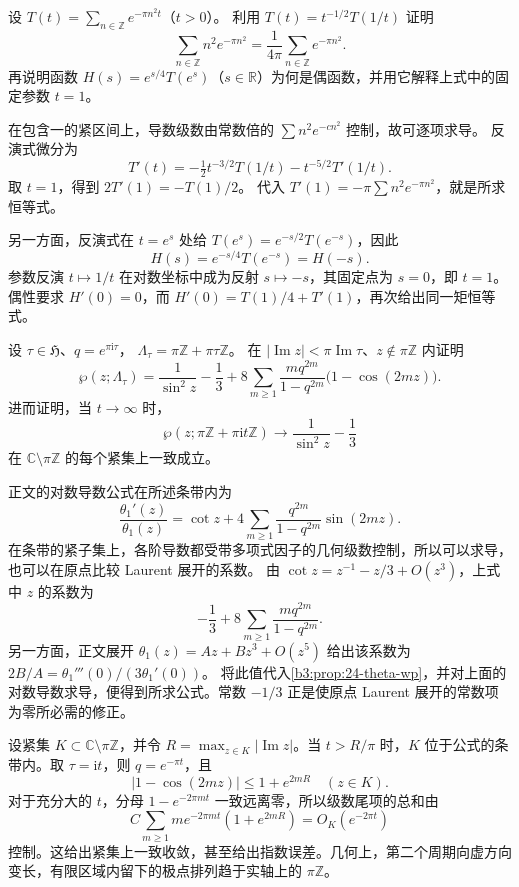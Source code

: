 \begin{exercise}\label{b3:ex:24-4}
设 \(T(t)=\sum_{n\in\mathbb Z}e^{-\pi n^2t}\)（\(t>0\)）。
利用 \(T(t)=t^{-1/2}T(1/t)\) 证明
\[
\sum_{n\in\mathbb Z}n^2e^{-\pi n^2}
=\frac1{4\pi}\sum_{n\in\mathbb Z}e^{-\pi n^2}.
\]
再说明函数 \(H(s)=e^{s/4}T(e^s)\)（\(s\in\mathbb R\)）为何是偶函数，并用它解释上式中的固定参数 \(t=1\)。
\end{exercise}
\begin{solution}
在包含一的紧区间上，导数级数由常数倍的
\(\sum n^2e^{-c n^2}\) 控制，故可逐项求导。
反演式微分为
\[
T'(t)=-\tfrac12t^{-3/2}T(1/t)-t^{-5/2}T'(1/t).
\]
取 \(t=1\)，得到 \(2T'(1)=-T(1)/2\)。
代入 \(T'(1)=-\pi\sum n^2e^{-\pi n^2}\)，就是所求恒等式。

另一方面，反演式在 \(t=e^s\) 处给
\(T(e^s)=e^{-s/2}T(e^{-s})\)，因此
\[
H(s)=e^{-s/4}T(e^{-s})=H(-s).
\]
参数反演 \(t\mapsto1/t\) 在对数坐标中成为反射
\(s\mapsto-s\)，其固定点为 \(s=0\)，即 \(t=1\)。
偶性要求 \(H'(0)=0\)，而
\(H'(0)=T(1)/4+T'(1)\)，再次给出同一矩恒等式。
\end{solution}

\begin{exercise}\label{b3:ex:24-5}
设 \(\tau\in\mathfrak H\)、\(q=e^{\pi\mathrm{i}\tau}\)，
\(\Lambda_\tau=\pi\mathbb Z+\pi\tau\mathbb Z\)。
在 \(|\operatorname{Im}z|<\pi\operatorname{Im}\tau\)、\(z\notin\pi\mathbb Z\) 内证明
\[
\wp(z;\Lambda_\tau)=\frac1{\sin^2z}-\frac13
 +8\sum_{m\ge1}\frac{m q^{2m}}{1-q^{2m}}
                         \bigl(1-\cos(2mz)\bigr).
\]
进而证明，当 \(t\to\infty\) 时，
\[
\wp(z;\pi\mathbb Z+\pi\mathrm{i}t\mathbb Z)
\longrightarrow\frac1{\sin^2z}-\frac13
\]
在 \(\mathbb C\setminus\pi\mathbb Z\) 的每个紧集上一致成立。
\end{exercise}
\begin{solution}
正文的对数导数公式在所述条带内为
\[
\frac{\theta_1'(z)}{\theta_1(z)}
=\cot z+4\sum_{m\ge1}
              \frac{q^{2m}}{1-q^{2m}}\sin(2mz).
\]
在条带的紧子集上，各阶导数都受带多项式因子的几何级数控制，所以可以求导，也可以在原点比较 Laurent 展开的系数。
由 \(\cot z=z^{-1}-z/3+O(z^3)\)，上式中 \(z\) 的系数为
\[
-\frac13+8\sum_{m\ge1}\frac{m q^{2m}}{1-q^{2m}}.
\]
另一方面，正文展开
\(\theta_1(z)=Az+Bz^3+O(z^5)\) 给出该系数为
\(2B/A=\theta_1'''(0)/(3\theta_1'(0))\)。
将此值代入\cref{b3:prop:24-theta-wp}，并对上面的对数导数求导，便得到所求公式。常数 \(-1/3\) 正是使原点 Laurent 展开的常数项为零所必需的修正。

设紧集 \(K\subset\mathbb C\setminus\pi\mathbb Z\)，并令
\(R=\max_{z\in K}|\operatorname{Im}z|\)。当 \(t>R/\pi\) 时，\(K\) 位于公式的条带内。取 \(\tau=\mathrm{i}t\)，则
\(q=e^{-\pi t}\)，且
\[
|1-\cos(2mz)|\le1+e^{2mR}\quad(z\in K).
\]
对于充分大的 \(t\)，分母 \(1-e^{-2\pi mt}\) 一致远离零，所以级数尾项的总和由
\[
C\sum_{m\ge1}m e^{-2\pi mt}(1+e^{2mR})
=O_K(e^{-2\pi t})
\]
控制。这给出紧集上一致收敛，甚至给出指数误差。几何上，第二个周期向虚方向变长，有限区域内留下的极点排列趋于实轴上的 \(\pi\mathbb Z\)。
\end{solution}


